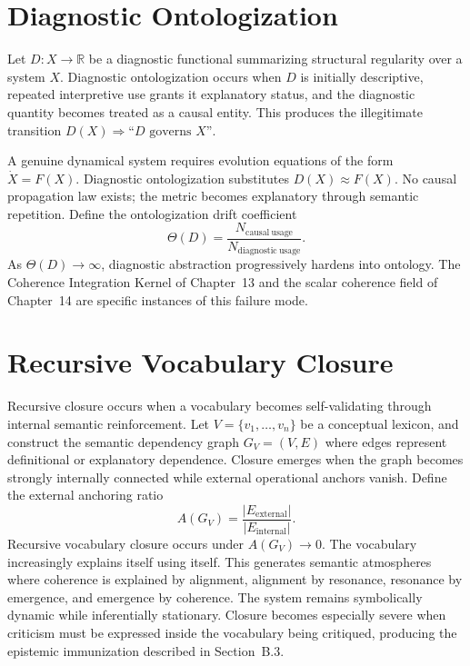\documentclass[12pt, openright, twoside]{book}
\begin{document}
\section{Diagnostic Ontologization}

Let $D : X \to \mathbb{R}$ be a diagnostic functional summarizing
structural regularity over a system $X$. Diagnostic ontologization occurs
when $D$ is initially descriptive, repeated interpretive use grants it
explanatory status, and the diagnostic quantity becomes treated as a
causal entity. This produces the illegitimate transition
$D(X) \Rightarrow \text{``}D \text{ governs } X\text{''}$.

A genuine dynamical system requires evolution equations of the form
$\dot{X} = F(X)$. Diagnostic ontologization substitutes $D(X) \approx F(X)$.
No causal propagation law exists; the metric becomes explanatory through
semantic repetition. Define the ontologization drift coefficient
\[
\Theta(D)
= \frac{N_{\mathrm{causal\ usage}}}{N_{\mathrm{diagnostic\ usage}}}.
\]
As $\Theta(D) \to \infty$, diagnostic abstraction progressively hardens
into ontology. The Coherence Integration Kernel of Chapter~13 and the
scalar coherence field of Chapter~14 are specific instances of this
failure mode.

\section{Recursive Vocabulary Closure}

Recursive closure occurs when a vocabulary becomes self-validating through
internal semantic reinforcement. Let $V = \{v_1, \ldots, v_n\}$ be a
conceptual lexicon, and construct the semantic dependency graph
$G_V = (V, E)$ where edges represent definitional or explanatory
dependence. Closure emerges when the graph becomes strongly internally
connected while external operational anchors vanish. Define the external
anchoring ratio
\[
A(G_V)
= \frac{|E_{\mathrm{external}}|}{|E_{\mathrm{internal}}|}.
\]
Recursive vocabulary closure occurs under $A(G_V) \to 0$. The vocabulary
increasingly explains itself using itself. This generates semantic
atmospheres where coherence is explained by alignment, alignment by
resonance, resonance by emergence, and emergence by coherence. The system
remains symbolically dynamic while inferentially stationary. Closure
becomes especially severe when criticism must be expressed inside the
vocabulary being critiqued, producing the epistemic immunization described
in Section~B.3.
\end{document}
